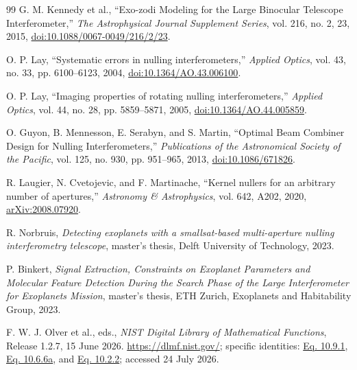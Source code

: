 \documentclass[12pt,a4paper]{article}
\numberwithin{equation}{section}
\numberwithin{figure}{section}
\numberwithin{table}{section}
\begin{document}
{\begin{thebibliography}{99}
G. M. Kennedy et al.,
``Exo-zodi Modeling for the Large Binocular Telescope Interferometer,''
\textit{The Astrophysical Journal Supplement Series}, vol. 216, no. 2, 23, 2015,
\href{https://doi.org/10.1088/0067-0049/216/2/23}{doi:10.1088/0067-0049/216/2/23}.

O. P. Lay,
``Systematic errors in nulling interferometers,''
\textit{Applied Optics}, vol. 43, no. 33, pp. 6100--6123, 2004,
\href{https://doi.org/10.1364/AO.43.006100}{doi:10.1364/AO.43.006100}.

O. P. Lay,
``Imaging properties of rotating nulling interferometers,''
\textit{Applied Optics}, vol. 44, no. 28, pp. 5859--5871, 2005,
\href{https://doi.org/10.1364/AO.44.005859}{doi:10.1364/AO.44.005859}.

O. Guyon, B. Mennesson, E. Serabyn, and S. Martin,
``Optimal Beam Combiner Design for Nulling Interferometers,''
\textit{Publications of the Astronomical Society of the Pacific}, vol. 125, no. 930, pp. 951--965, 2013,
\href{https://doi.org/10.1086/671826}{doi:10.1086/671826}.

R. Laugier, N. Cvetojevic, and F. Martinache,
``Kernel nullers for an arbitrary number of apertures,''
\textit{Astronomy \& Astrophysics}, vol. 642, A202, 2020,
\href{https://arxiv.org/abs/2008.07920}{arXiv:2008.07920}.

R. Norbruis,
\textit{Detecting exoplanets with a smallsat-based multi-aperture nulling interferometry telescope},
master's thesis, Delft University of Technology, 2023.

P. Binkert,
\textit{Signal Extraction, Constraints on Exoplanet Parameters and Molecular Feature Detection During the Search Phase of the Large Interferometer for Exoplanets Mission},
master's thesis, ETH Zurich, Exoplanets and Habitability Group, 2023.

F. W. J. Olver et al., eds.,
\textit{NIST Digital Library of Mathematical Functions}, Release 1.2.7, 15 June 2026.
\url{https://dlmf.nist.gov/}; specific identities:
\href{https://dlmf.nist.gov/10.9.E1}{Eq. 10.9.1},
\href{https://dlmf.nist.gov/10.6.E6a}{Eq. 10.6.6a}, and
\href{https://dlmf.nist.gov/10.2.E2}{Eq. 10.2.2}; accessed 24 July 2026.

\end{thebibliography}
}
 
\end{document}
